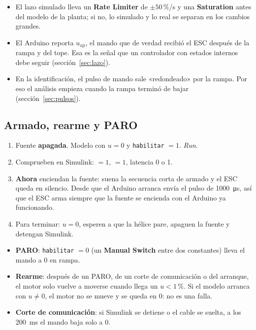 \documentclass[11pt,letterpaper]{article}
\newcommand{\blq}[1]{\textsf{\textbf{#1}}}                 %
\newcommand{\sen}[1]{\texttt{\detokenize{#1}}}             %
\begin{document}
\begin{cuidado}
\begin{itemize}[leftmargin=12pt]
  \item El lazo simulado lleva un \blq{Rate Limiter} de $\pm50$\,\%/s y una \blq{Saturation} antes del modelo de la planta; si no, lo simulado y lo real se separan en los cambios grandes.
  \item El Arduino reporta $u_\text{ap}$, el mando que de verdad recibió el ESC después de la rampa y del tope. Esa es la señal que un controlador con estados internos debe seguir (sección~\ref{sec:lazo}).
  \item En la identificación, el pulso de mando sale «redondeado» por la rampa. Por eso el análisis empieza cuando la rampa terminó de bajar (sección~\ref{sec:pulsos}).
\end{itemize}
\end{cuidado}

\subsection{Armado, rearme y PARO}

\begin{pasos}
\begin{enumerate}[leftmargin=14pt]
  \item Fuente \textbf{apagada}. Modelo con $u=0$ y \texttt{habilitar} $=1$. \emph{Run}.
  \item Comprueben en Simulink: \sen{estado} $=1$, \sen{valido} $=1$, latencia 0 o 1.
  \item \textbf{Ahora} enciendan la fuente: suena la secuencia corta de armado y el ESC queda en silencio. Desde que el Arduino arranca envía el pulso de \SI{1000}{\micro s}, así que el ESC arma siempre que la fuente se encienda con el Arduino ya funcionando.
  \item Para terminar: $u=0$, esperen a que la hélice pare, apaguen la fuente y detengan Simulink.
\end{enumerate}
\end{pasos}

\begin{itemize}[leftmargin=12pt]
  \item \textbf{PARO}: \texttt{habilitar} $=0$ (un \blq{Manual Switch} entre dos constantes) lleva el mando a 0 en rampa.
  \item \textbf{Rearme}: después de un PARO, de un corte de comunicación o del arranque, el motor solo vuelve a moverse cuando llega un $u<1\,\%$. Si el modelo arranca con $u\ne0$, el motor no se mueve y \sen{estado} se queda en 0: no es una falla.
  \item \textbf{Corte de comunicación}: si Simulink se detiene o el cable se suelta, a los \SI{200}{ms} el mando baja solo a 0.
\end{itemize}
\end{document}
